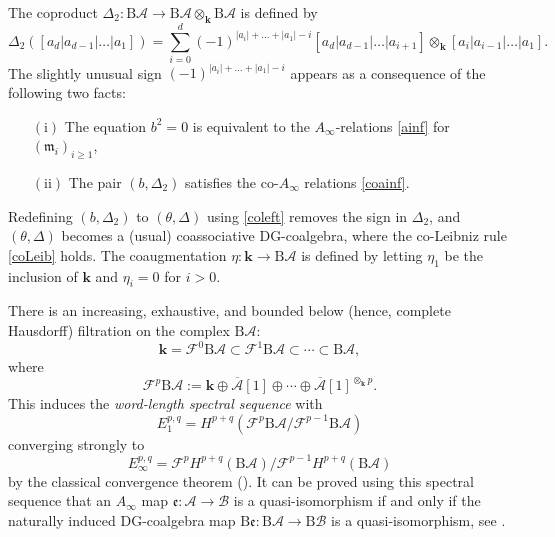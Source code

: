 \documentclass{gtpart}
\renewcommand{\k}{\mathbf{k}}
\newcommand{\m}{\mathfrak{m}}
\newcommand{\e}{\mathfrak{e}}
\newcommand{\A}{\mathscr{A}}
\newcommand{\Abar}{\overline{\mathscr{A}}}
\renewcommand{\Bar}{\mathrm{B}}
\newcommand{\B}{\mathscr{B}}
\newcommand{\F}{\mathcal{F}}
\begin{document}
The coproduct $\Delta_2 \colon \Bar \A \to \Bar \A \otimes_\k \Bar \A $ is defined by
\[ 
\Delta_2 ([a_d|a_{d-1}|\ldots |a_1]) = \sum_{i=0}^d (-1)^{|a_i|+\ldots+|a_1|-i}  [a_d|a_{d-1}|\ldots|a_{i+1}] \otimes_\k [a_{i}|
    a_{i-1}|\ldots | a_1]. 
\]
The slightly unusual sign $(-1)^{|a_i|+\ldots+|a_1|-i}$ appears as a consequence of the following two facts:
\begin{itemize}
\item[$(\mathrm{i})$]
    The equation $b^2=0$ is equivalent to the $A_\infty$-relations \eqref{ainf} for
$(\m_i)_{i\geq 1}$, 
\item[$(\mathrm{ii})$]
The pair $(b,\Delta_2)$ satisfies the co-$A_\infty$ relations
\eqref{coainf}. 
\end{itemize}
Redefining $(b,\Delta_2)$ to $(\theta, \Delta) $
using \eqref{coleft} removes the sign in $\Delta_2$, and $(\theta, \Delta)$ becomes a (usual)
coassociative DG-coalgebra, where the co-Leibniz rule \eqref{coLeib} holds. The coaugmentation $\eta\colon \k \to \Bar \A$ is defined by letting $\eta_{1}$ be the inclusion of $\k$ and $\eta_{i}=0$ for $i>0$.

There is an increasing, exhaustive, and bounded below (hence, complete Hausdorff) filtration on the complex  $\Bar \A$:
\[ 
\k = \F^{0}\Bar\A \subset \F^1 \Bar\A \subset \cdots \subset \Bar \A, 
\]
where
\[ 
\F^p \Bar \A := \k \oplus \Abar[1] \oplus \cdots \oplus \Abar[1]^{\otimes_\k p}.  
\]
This induces the \emph{word-length spectral sequence} with
\[ E_1^{p,q} = H^{p+q} (\F^{p} \Bar \A / \F^{p-1} \Bar \A) \]
converging strongly to
\[ E_\infty^{p,q} = \F^{p} H^{p+q} (\Bar \A) / \F^{p-1} H^{p+q} (\Bar \A) \]
by the classical convergence theorem (\cite[Theorem 5.5.1]{weibel}). It can be proved using this spectral sequence that an $A_\infty$ map $\e \colon \A \to \B$ is a
quasi-isomorphism if and only if the naturally induced DG-coalgebra map $\Bar\e \colon \Bar \A \to \Bar \B$ is a quasi-isomorphism, see \cite[Proposition 2.2.3]{LV}. 
\end{document}
